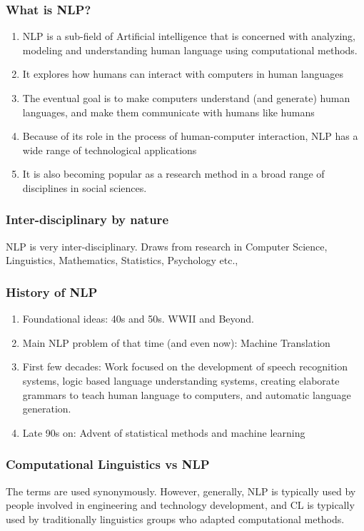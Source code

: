 \documentclass{beamer}
\begin{document}
\begin{frame}
\frametitle{What is NLP?}
\begin{enumerate}
\item NLP is a sub-field of Artificial intelligence that is concerned with analyzing, modeling and understanding human language using computational methods. 
\item It explores how humans can interact with computers in human languages
\item The eventual goal is to make computers understand (and generate) human languages, and make them communicate with humans like humans
\item Because of its role in the process of human-computer interaction, NLP has a wide range of technological applications
\item It is also becoming popular as a research method in a broad range of disciplines in social sciences. 
\end{enumerate}
\end{frame}

\begin{frame}
\frametitle{Inter-disciplinary by nature}
NLP is very inter-disciplinary. Draws from research in Computer Science, Linguistics, Mathematics, Statistics, Psychology etc.,
\end{frame}

\begin{frame}
\frametitle{History of NLP}
\begin{enumerate}
\item Foundational ideas: 40s and 50s. WWII and Beyond.
\item Main NLP problem of that time (and even now): Machine Translation
\item First few decades: Work focused on the development of speech recognition systems, logic based language understanding systems, creating elaborate grammars to teach human language to computers, and automatic language generation.
\item Late 90s on: Advent of statistical methods and machine learning
\end{enumerate}
\end{frame}

\begin{frame}
\frametitle{Computational Linguistics vs NLP}
The terms are used synonymously. However, generally, NLP is typically used by people involved in engineering and technology development, and CL is typically used by traditionally linguistics groups who adapted computational methods.
\end{frame}
\end{document}
